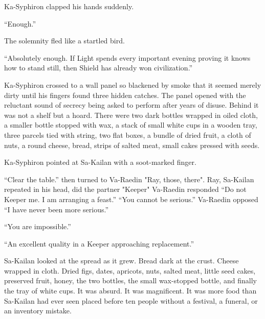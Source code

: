 Ka-Syphiron clapped his hands suddenly.\par
“Enough.”\par
The solemnity fled like a startled bird.\par
“Absolutely enough. If Light spends every important evening proving it knows how to stand still, then Shield has already won civilization.”\par
Ka-Syphiron crossed to a wall panel so blackened by smoke that it seemed merely dirty until his fingers found three hidden catches.
The panel opened with the reluctant sound of secrecy being asked to perform after years of disuse. Behind it was not a shelf but a hoard.
There were two dark bottles wrapped in oiled cloth, a smaller bottle stopped with wax, a stack of small white cups in a wooden tray, 
three parcels tied with string, two flat boxes, a bundle of dried fruit, a cloth of nuts, a round cheese, bread, strips of salted meat, 
small cakes pressed with seeds. \par

Ka-Syphiron pointed at Sa-Kailan with a soot-marked finger.\par
“Clear the table.” then turned to Va-Raedin "Ray, those, there". Ray, Sa-Kailan repeated in his head, did the partner
"Keeper" Va-Raedin responded
“Do not Keeper me. I am arranging a feast.”
“You cannot be serious.” Va-Raedin opposed
“I have never been more serious.”\par
“You are impossible.”\par
“An excellent quality in a Keeper approaching replacement.”\par

Sa-Kailan looked at the spread as it grew. 
Bread dark at the crust. 
Cheese wrapped in cloth. 
Dried figs, dates, apricots, nuts, salted meat, little seed cakes, preserved fruit, honey, the two bottles, the small wax-stopped bottle, and finally the tray of white cups.
It was absurd.
It was magnificent.
It was more food than Sa-Kailan had ever seen placed before ten people without a festival, a funeral, or an inventory mistake.\par


